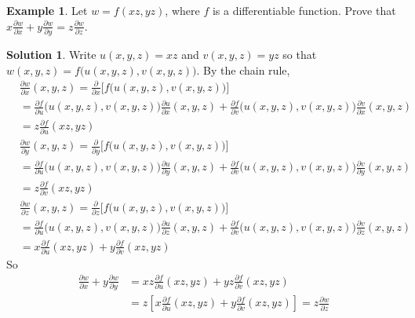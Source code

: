 \documentclass[10pt]{beamer}
\newcommand{\ds}{\displaystyle}
\theoremstyle{definition}
\newtheorem*{ex}{Example}
\newtheorem*{sol}{Solution}
\newcommand{\pdiff}[2]{\frac{\partial #1}{\partial #2}}
\begin{document}
\begin{frame}
\begin{ex}
  Let $w = f(x z, y z)$, where $f$ is a differentiable function. Prove that $\ds x\frac{\partial w}{\partial x} + y\frac{\partial w}{\partial y} = z\frac{\partial w}{\partial z}$.
\end{ex}

\begin{sol}
  Write $u(x,y,z)=xz$ and $v(x,y,z)=yz$ so that $w(x,y,z) = f\big(u(x,y,z), v(x,y,z)\big)$. By the chain rule,
  \begin{align*}
    &\pdiff{w}{x}(x,y,z) = \pdiff{}{x}\big[f \big(u(x,y,z), v(x,y,z)\big)\big] \\
    &= \pdiff{f}{u}\big(u(x,y,z), v(x,y,z)\big)\pdiff{u}{x}(x,y,z) + \pdiff{f}{v}\big(u(x,y,z), v(x,y,z)\big)\pdiff{v}{x}(x,y,z) \\ 
    &= z\pdiff{f}{u}(xz, yz)
  \end{align*}
  \begin{align*}
    &\pdiff{w}{y}(x,y,z) = \pdiff{}{y}\big[f \big(u(x,y,z), v(x,y,z)\big)\big] \\
    &= \pdiff{f}{u}\big(u(x,y,z), v(x,y,z)\big)\pdiff{u}{y}(x,y,z) + \pdiff{f}{v}\big(u(x,y,z), v(x,y,z)\big)\pdiff{v}{y}(x,y,z) \\
    &= z\pdiff{f}{v}(xz, yz)
  \end{align*}
  \begin{align*}
    &\pdiff{w}{z}(x,y,z) = \pdiff{}{z}\big[f \big(u(x,y,z), v(x,y,z)\big)\big] \\
    &= \pdiff{f}{u}\big(u(x,y,z), v(x,y,z)\big)\pdiff{u}{z}(x,y,z) + \pdiff{f}{v}\big(u(x,y,z), v(x,y,z)\big)\pdiff{v}{z}(x,y,z) \\
    &= x\pdiff{f}{u}(xz, yz) + y\pdiff{f}{v}(xz, yz)
  \end{align*}
  So
  \begin{align*}
    \pdiff{w}{x} + y\pdiff{w}{y} &= xz\pdiff{f}{u}(xz, yz) + yz\pdiff{f}{v}(xz, yz) \\&= z\left[x\pdiff{f}{u}(xz, yz) + y\pdiff{f}{v}(xz, yz)\right] = z\pdiff{w}{z}
  \end{align*}
\end{sol}
\end{frame}
\end{document}
